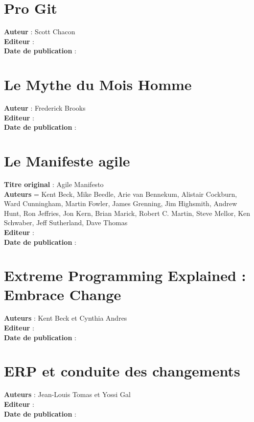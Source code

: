 
\section*{Pro Git}

\textbf{Auteur} : Scott Chacon\\
\textbf{Editeur} : \\
\textbf{Date de publication} : \\

\section*{Le Mythe du Mois Homme}

\textbf{Auteur} : Frederick Brooks\\
\textbf{Editeur} : \\
\textbf{Date de publication} : \\

\section*{Le Manifeste agile}

\textbf{Titre original} : Agile Manifesto\\
\textbf{Auteurs} = Kent Beck, Mike Beedle, Arie van Bennekum, Alistair Cockburn, Ward Cunningham, Martin Fowler, James Grenning, Jim Highsmith, Andrew Hunt, Ron Jeffries, Jon Kern, Brian Marick, Robert C. Martin, Steve Mellor, Ken Schwaber, Jeff Sutherland, Dave Thomas\\
\textbf{Editeur} : \\
\textbf{Date de publication} : \\

\section*{Extreme Programming Explained : Embrace Change}

\textbf{Auteurs} : Kent Beck et Cynthia Andres\\
\textbf{Editeur} : \\
\textbf{Date de publication} : \\

\section*{ERP et conduite des changements}

\textbf{Auteurs} : Jean-Louis Tomas et Yossi Gal\\
\textbf{Editeur} : \\
\textbf{Date de publication} : \\
